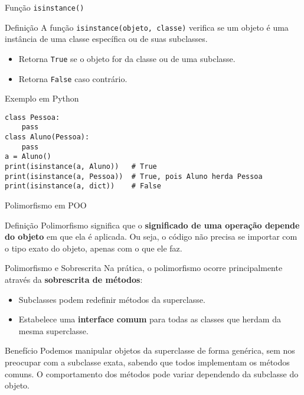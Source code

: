 \begin{frame}[fragile]{Função \texttt{isinstance()}}

    \begin{block}{Definição}
        A função \texttt{isinstance(objeto, classe)} verifica se um objeto é uma instância de uma classe específica ou de suas subclasses.

        \begin{itemize}
            \item Retorna \texttt{True} se o objeto for da classe ou de uma subclasse.
            \item Retorna \texttt{False} caso contrário.
        \end{itemize}
    \end{block}

    \begin{exampleblock}{Exemplo em Python}
        \begin{verbatim}
class Pessoa:
    pass
class Aluno(Pessoa):
    pass
a = Aluno()
print(isinstance(a, Aluno))   # True
print(isinstance(a, Pessoa))  # True, pois Aluno herda Pessoa
print(isinstance(a, dict))    # False
\end{verbatim}
    \end{exampleblock}

\end{frame}

\begin{frame}{Polimorfismo em POO}

    \begin{block}{Definição}
        Polimorfismo significa que o \textbf{significado de uma operação depende do objeto} em que ela é aplicada.
        Ou seja, o código não precisa se importar com o tipo exato do objeto, apenas com o que ele faz.
    \end{block}

    \begin{block}{Polimorfismo e Sobrescrita}
        Na prática, o polimorfismo ocorre principalmente através da \textbf{sobrescrita de métodos}:

        \begin{itemize}
            \item Subclasses podem redefinir métodos da superclasse.
            \item Estabelece uma \textbf{interface comum} para todas as classes que herdam da mesma superclasse.
        \end{itemize}
    \end{block}

    \begin{block}{Benefício}
        Podemos manipular objetos da superclasse de forma genérica, sem nos preocupar com a subclasse exata, sabendo que todos implementam os métodos comuns.
        O comportamento dos métodos pode variar dependendo da subclasse do objeto.
    \end{block}

\end{frame}


